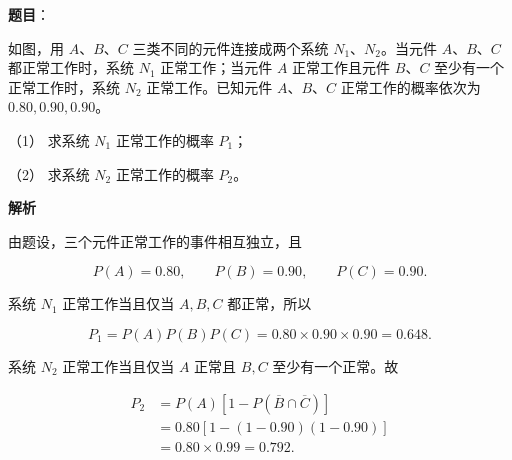 \begin{answer}

\textbf{题目}：

如图，用 $A$、$B$、$C$ 三类不同的元件连接成两个系统 $N_1$、$N_2$。当元件 $A$、$B$、$C$ 都正常工作时，系统 $N_1$ 正常工作；当元件 $A$ 正常工作且元件 $B$、$C$ 至少有一个正常工作时，系统 $N_2$ 正常工作。已知元件 $A$、$B$、$C$ 正常工作的概率依次为 $0.80,0.90,0.90$。
\nopagebreak[4]
\begin{center}\end{center}
\nopagebreak[4]
（1） 求系统 $N_1$ 正常工作的概率 $P_1$；

（2） 求系统 $N_2$ 正常工作的概率 $P_2$。

\textbf{解析}

由题设，三个元件正常工作的事件相互独立，且

\nopagebreak[4]
\[
P(A)=0.80,\qquad P(B)=0.90,\qquad P(C)=0.90.
\]


系统 $N_1$ 正常工作当且仅当 $A,B,C$ 都正常，所以

\nopagebreak[4]
\[
P_1=P(A)P(B)P(C)
=0.80\times0.90\times0.90=0.648.
\]


系统 $N_2$ 正常工作当且仅当 $A$ 正常且 $B,C$ 至少有一个正常。故

\nopagebreak[4]
\[
\begin{aligned}
P_2
&=P(A)\left[1-P(\overline B\cap\overline C)\right]\\
&=0.80\left[1-(1-0.90)(1-0.90)\right]\\
&=0.80\times0.99=0.792.
\end{aligned}
\]



\end{answer}
